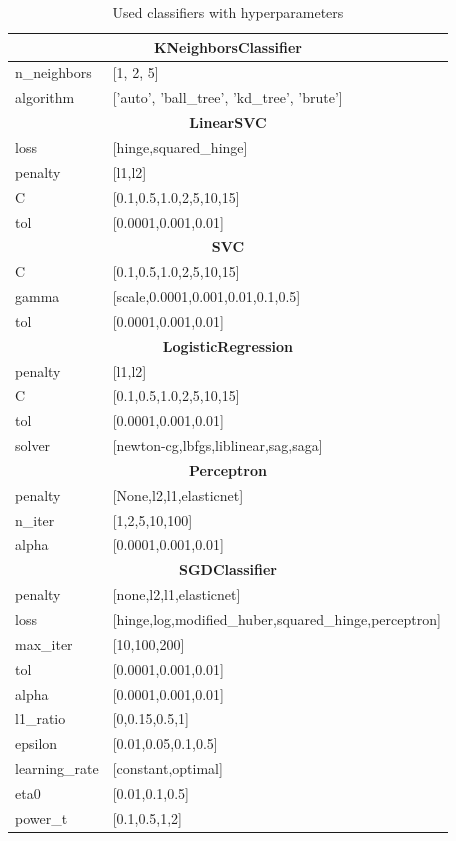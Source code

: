 {\footnotesize
\begin{longtable}{l l}
\caption{Used classifiers with hyperparameters} \label{tab:clf} \\

\toprule
\multicolumn{2}{c}{\textbf{KNeighborsClassifier}} \\*
\midrule

n\_neighbors & [1, 2, 5] \\
algorithm & ['auto', 'ball\_tree', 'kd\_tree', 'brute'] \\

\midrule
\multicolumn{2}{c}{\textbf{LinearSVC}} \\*
\midrule

loss & [hinge,squared\_hinge] \\
penalty & [l1,l2] \\
C & [0.1,0.5,1.0,2,5,10,15] \\
tol & [0.0001,0.001,0.01] \\

\midrule
\multicolumn{2}{c}{\textbf{SVC}} \\*
\midrule

C & [0.1,0.5,1.0,2,5,10,15] \\
gamma & [scale,0.0001,0.001,0.01,0.1,0.5] \\
tol & [0.0001,0.001,0.01] \\

\midrule
\multicolumn{2}{c}{\textbf{LogisticRegression}} \\*
\midrule

penalty & [l1,l2] \\
C & [0.1,0.5,1.0,2,5,10,15] \\
tol & [0.0001,0.001,0.01] \\
solver & [newton-cg,lbfgs,liblinear,sag,saga] \\

\midrule
\multicolumn{2}{c}{\textbf{Perceptron}} \\*
\midrule

penalty & [None,l2,l1,elasticnet] \\
n\_iter & [1,2,5,10,100] \\
alpha & [0.0001,0.001,0.01] \\

\midrule
\multicolumn{2}{c}{\textbf{SGDClassifier}} \\*
\midrule

penalty & [none,l2,l1,elasticnet] \\
loss & [hinge,log,modified\_huber,squared\_hinge,perceptron] \\
max\_iter & [10,100,200] \\
tol & [0.0001,0.001,0.01] \\
alpha & [0.0001,0.001,0.01] \\
l1\_ratio & [0,0.15,0.5,1] \\
epsilon & [0.01,0.05,0.1,0.5] \\
learning\_rate & [constant,optimal] \\
eta0 & [0.01,0.1,0.5] \\
power\_t & [0.1,0.5,1,2] \\


\end{longtable}}

